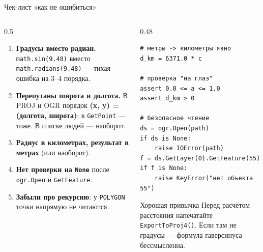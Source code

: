 \documentclass[aspectratio=169,10pt]{beamer}
\begin{document}
\begin{frame}[fragile]{Чек-лист «как не ошибиться»}
\footnotesize
\begin{columns}[T,onlytextwidth]
  \begin{column}{0.5\textwidth}
    \begin{enumerate}\itemsep1pt
      \item \textbf{Градусы вместо радиан.}
            \texttt{math.sin(9.48)} вместо \texttt{math.radians(9.48)} ---
            тихая ошибка на 3--4 порядка.
      \item \textbf{Перепутаны широта и долгота.} В PROJ и OGR порядок
            \textbf{(x, y) = (долгота, широта)}; в \texttt{GetPoint} ---
            тоже. В списке людей --- наоборот.
      \item \textbf{Радиус в километрах, результат в метрах}
            (или наоборот).
      \item \textbf{Нет проверки на \texttt{None}} после
            \texttt{ogr.Open} и \texttt{GetFeature}.
      \item \textbf{Забыли про рекурсию}: у \texttt{POLYGON} точки
            напрямую не читаются.
    \end{enumerate}
  \end{column}
  \begin{column}{0.48\textwidth}
    \begin{Verbatim}[fontsize=\scriptsize]
# метры -> километры явно
d_km = 6371.0 * c

# проверка "на глаз"
assert 0.0 <= a <= 1.0
assert d_km > 0

# безопасное чтение
ds = ogr.Open(path)
if ds is None:
    raise IOError(path)
f = ds.GetLayer(0).GetFeature(55)
if f is None:
    raise KeyError("нет объекта 55")
\end{Verbatim}
    \vspace{0.2em}
    \begin{block}{Хорошая привычка}\small
      Перед расчётом расстояния напечатайте \texttt{ExportToProj4()}.
      Если там не градусы --- формула гаверсинуса бессмысленна.
    \end{block}
  \end{column}
\end{columns}
\end{frame}
\end{document}
